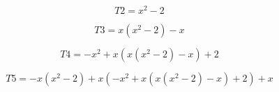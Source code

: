 \documentclass[letterpaper, 10pt]{extarticle}
\begin{document}
\begin{dmath*}
T2 =
    x^{2} - 2
\end{dmath*}


\begin{dmath*}
T3 =
    x \left(x^{2} - 2\right) - x
\end{dmath*}


\begin{dmath*}
T4 =
    - x^{2} + x \left(x \left(x^{2} - 2\right) - x\right) + 2
\end{dmath*}


\begin{dmath*}
T5 =
    - x \left(x^{2} - 2\right) + x \left(- x^{2} + x \left(x \left(x^{2} - 2\right) - x\right) + 2\right) + x
\end{dmath*}
\end{document}
